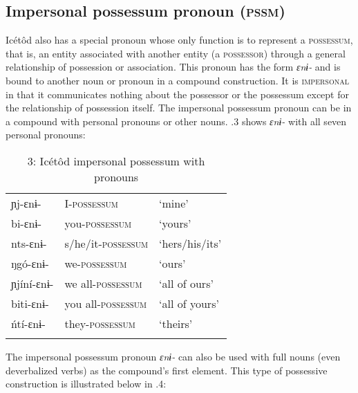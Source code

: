 \subsection{Impersonal possessum pronoun (\textsc{pssm})}


Icétôd also has a special pronoun whose only function is to represent a \textsc{possessum}, that is, an entity associated with another entity (a \textsc{possessor}) through a general relationship of possession or association. This pronoun has the form \textit{ɛnɨ-} and is bound to another noun or pronoun in a compound construction. It is \textsc{impersonal} in that it communicates nothing about the possessor or the possessum except for the relationship of possession itself. The impersonal possessum pronoun can be in a compound with personal pronouns or other nouns. .3 shows \textit{ɛnɨ-} with all seven personal pronouns:


\begin{table}
\caption{3: Icétôd impersonal possessum with pronouns}
\label{tab:5}


\begin{tabularx}{\textwidth}{XXX}
\lsptoprule

ɲj-ɛnɨ- & I-\textsc{possessum} & ‘mine’\\
bi-ɛnɨ- & you-\textsc{possessum} & ‘yours’\\
nts-ɛnɨ- & s/he/it-\textsc{possessum} & ‘hers/his/its’\\
ŋgó-ɛnɨ- & we-\textsc{possessum} & ‘ours’\\
ɲjíní-ɛnɨ- & we all-\textsc{possessum} & ‘all of ours’\\
biti-ɛnɨ- & you all-\textsc{possessum} & ‘all of yours’\\
ńtí-ɛnɨ- & they-\textsc{possessum} & ‘theirs’\\
\lspbottomrule
\end{tabularx}
\end{table}
The impersonal possessum pronoun \textit{ɛnɨ-} can also be used with full nouns (even deverbalized verbs) as the compound’s first element. This type of possessive construction is illustrated below in .4:


